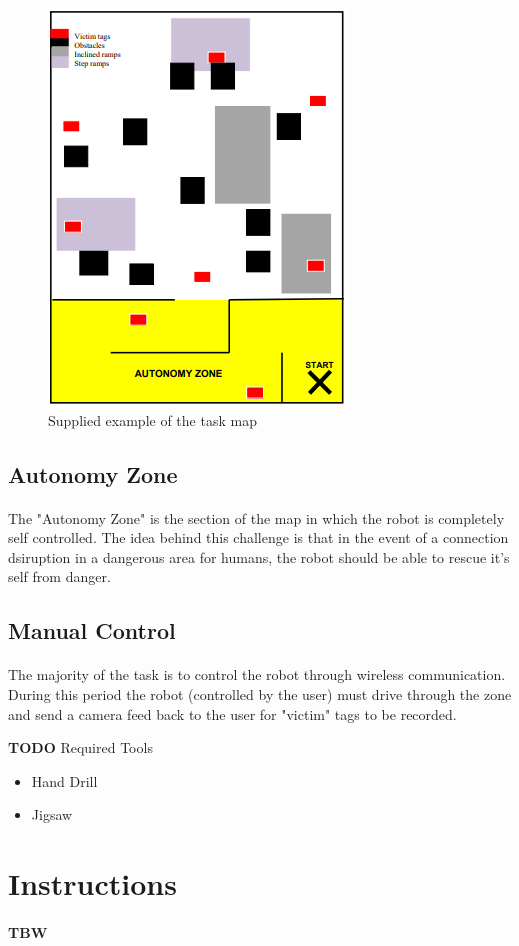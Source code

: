 \documentclass[12pt, a4paper]{article}
\newcommand{\TODO}[1]{{\color{red}\textbf{TODO} #1}}
\begin{document}
\begin{figure}[h]
  \includegraphics{Images/AutonZone.png}
  \centering
  \caption{Supplied example of the task map}
  \label{fig:intro:map}
\end{figure}

\subsection{Autonomy Zone}
  \paragraph{}
    The "Autonomy Zone" is the section of the map in which the robot is completely self controlled. The idea behind this challenge is that in the event of a connection dsiruption in a dangerous area for humans, the robot should be able to rescue it's self from danger.

\subsection{Manual Control}
 \paragraph{}
    The majority of the task is to control the robot through wireless communication. During this period the robot (controlled by the user) must drive through the zone and send a camera feed back to the user for "victim" tags to be recorded.

\TODO {Required Tools}
\begin{itemize}
  \item Hand Drill
  \item Jigsaw
\end{itemize}

\newpage

\section{Instructions} \label{sec:Instructions}
\paragraph{ TBW }
\end{document}
